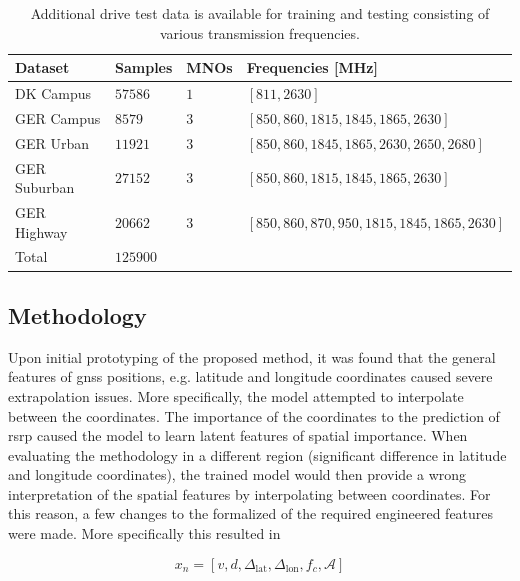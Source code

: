\begin{table}[h]
\footnotesize
\begin{tabular}{@{}llll@{}}
\toprule
Dataset      & Samples & MNOs & Frequencies  [MHz]       \\ \midrule
DK Campus    & $57586$   & $1$    & $[811, 2630]$ \\
GER Campus   & $8579$    & $3$    & $[850, 860, 1815, 1845, 1865, 2630]$                   \\
GER Urban    & $11921$   & $3$    &  $[850, 860, 1845, 1865, 2630, 2650, 2680]$ \\
GER Suburban & $27152$   & $3$    &  $[850, 860, 1815, 1845, 1865,2630]$                   \\
GER Highway  & $20662$   & $3$    & $[850, 860, 870, 950, 1815, 1845, 1865,2630]$                    \\ \midrule
Total        & $125900$  &      &                     \\ \bottomrule
\end{tabular}
\vspace{1em}
\caption{Additional drive test data is available for training and testing consisting of various transmission frequencies.}\label{tab:drive_test_data_total}
\end{table}

\subsection{Methodology}

Upon initial prototyping of the proposed method, it was found that the general features of \gls{gnss} positions, e.g. latitude and longitude coordinates caused severe extrapolation issues. More specifically, the model attempted to interpolate between the coordinates. The importance of the coordinates to the prediction of \gls{rsrp} caused the model to learn latent features of spatial importance. When evaluating the methodology in a different region (significant difference in latitude and longitude coordinates), the trained model would then provide a wrong interpretation of the spatial features by interpolating between coordinates. For this reason, a few changes to the formalized of the required engineered features were made. More specifically this resulted in

\begin{equation}
    x_n = [v, d, \Delta_\text{lat}, \Delta_\text{lon},  f_c, \mathcal{A}]
\end{equation}

